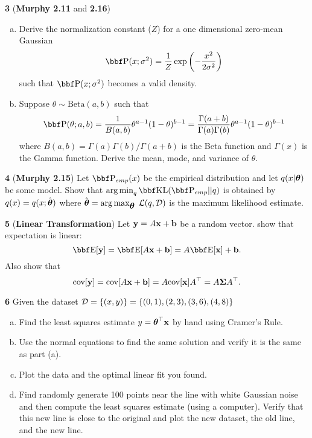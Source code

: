 \documentclass[12pt,letterpaper,fleqn]{hmcpset}
\begin{document}
\textbf{3} (\textbf{Murphy 2.11} and \textbf{2.16})
\begin{enumerate}[(a)]
    \item Derive the normalization constant ($Z$) for a one dimensional
        zero-mean Gaussian
        \[
            \PP(x; \sigma^2) = \frac{1}{Z}\exp\left(-\frac{x^2}{2\sigma^2}\right)
        \]
        such that $\PP(x; \sigma^2)$ becomes a valid density.
    \item Suppose $\theta \sim \text{Beta}(a,b)$ such
        that
        \[
            \PP(\theta; a,b) = \frac{1}{B(a,b)} \theta^{a-1}(1-\theta)^{b-1} = \frac{\Gamma(a+b)}{\Gamma(a)\Gamma(b)} \theta^{a-1}(1-\theta)^{b-1}
        \]
        where $B(a,b) = \Gamma(a)\Gamma(b)/\Gamma(a+b)$ is the Beta function
        and $\Gamma(x)$ is the Gamma function.
        Derive the mean, mode, and variance of $\theta$.
\end{enumerate}

\textbf{4} (\textbf{Murphy 2.15}) Let $\PP_{emp}(x)$ be the empirical distribution and let
$q(x|\hbox{\boldmath$\theta$})$ be some model. Show that $\argmin_q \KL(\PP_{emp} || q)$ is obtained by
$q(x) = q(x ; \hat{\hbox{\boldmath$\theta$}})$ where $\hat{\hbox{\boldmath$\theta$}} = \operatorname*{arg\,max}_{\hbox{\boldmath$\theta$}} \;{\cal L}(q, {\cal D})$ is
the maximum likelihood estimate.

\textbf{5} (\textbf{Linear Transformation}) Let ${\bf y} = A{\bf x} + {\bf b}$ be a random vector.
show that expectation is linear:
\[
    \EE[\yy] = \EE[A\xx + \bb] = A\EE[\xx] + \bb.
\]
Also show that
\[
    {\hbox{cov}}[{\bf y}] = {\hbox{cov}}[A{\bf x} + {\bf b}] = A {\hbox{cov}}[{\bf x}] A^\top = A\hbox{\boldmath$\Sigma$} A^\top.
\]

\textbf{6} Given the dataset ${\cal D} = \{(x,y)\} = \{(0,1), (2,3), (3,6), (4,8)\}$
\begin{enumerate}[(a)]
    \item Find the least squares estimate $y = \hbox{\boldmath$\theta$}^\top{\bf x}$ by hand using
        Cramer's Rule.
    \item Use the normal equations to find the same solution and verify it
        is the same as part (a).
    \item Plot the data and the optimal linear fit you found.
    \item Find randomly generate 100 points near the line with white Gaussian
        noise and then compute the least squares estimate (using a computer).
        Verify that this new line is close to the original and plot the new
        dataset, the old line, and the new line.
\end{enumerate}
\end{document}
